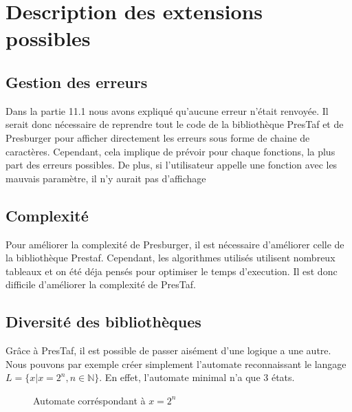 \section{Description des extensions possibles}

\subsection{Gestion des erreurs}

Dans la partie 11.1 nous avons expliqué qu'aucune erreur n'était renvoyée. Il serait donc nécessaire de reprendre tout le code de la bibliothèque PresTaf et de Presburger pour afficher directement les erreurs sous forme de chaine de caractères. Cependant, cela implique de prévoir pour chaque fonctions, la plus part des erreurs possibles. De plus, si l'utilisateur appelle une fonction avec les mauvais paramètre, il n'y aurait pas d'affichage


\subsection{Complexité}

Pour améliorer la complexité de Presburger, il est nécessaire d'améliorer celle de la bibliothèque Prestaf. Cependant, les algorithmes utilisés utilisent nombreux tableaux et on été déja pensés pour optimiser le temps d'execution. Il est donc difficile d'améliorer la complexité de PresTaf.

\subsection{Diversité des bibliothèques}

Grâce à PresTaf, il est possible de passer aisément d'une logique a une autre. Nous pouvons par exemple créer simplement l'automate reconnaissant le langage $L = \{x | x = 2^n, n \in \mathbb{N} \}$. En effet, l'automate minimal n'a que 3 états.

\begin{figure}[h]

\centering

\caption{Automate corréspondant à $x = 2^n$}
\end{figure}

